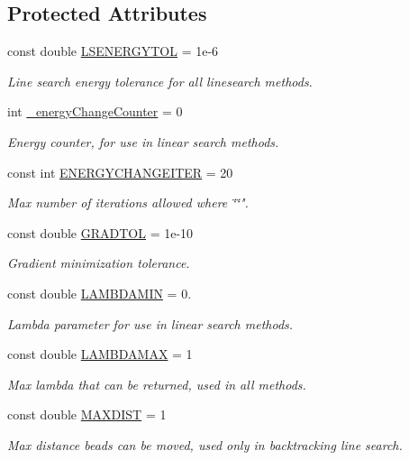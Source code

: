 \subsection*{Protected Attributes}
\begin{DoxyCompactItemize}
\item 
const double \hyperlink{classCGMethod_a084794992bdcec9285f6512b56e6c578}{L\+S\+E\+N\+E\+R\+G\+Y\+T\+O\+L} = 1e-\/6
\begin{DoxyCompactList}\small\item\em Line search energy tolerance for all linesearch methods. \end{DoxyCompactList}\item 
int \hyperlink{classCGMethod_aadb778c988685e46d7d109350973d826}{\+\_\+energy\+Change\+Counter} = 0
\begin{DoxyCompactList}\small\item\em Energy counter, for use in linear search methods. \end{DoxyCompactList}\item 
const int \hyperlink{classCGMethod_aaee1e11813855cc66c360f7cb3d9665a}{E\+N\+E\+R\+G\+Y\+C\+H\+A\+N\+G\+E\+I\+T\+E\+R} = 20
\begin{DoxyCompactList}\small\item\em Max number of iterations allowed where \char`\"{}\char`\"{}". \end{DoxyCompactList}\item 
const double \hyperlink{classCGMethod_ad0118dc4da7526f196a4b4172bba9625}{G\+R\+A\+D\+T\+O\+L} = 1e-\/10
\begin{DoxyCompactList}\small\item\em Gradient minimization tolerance. \end{DoxyCompactList}\end{DoxyCompactItemize}
{\bf }\par
\begin{DoxyCompactItemize}
\item 
const double \hyperlink{classCGMethod_ae28b20ab18f9a0b7c6a1c443add1026e}{L\+A\+M\+B\+D\+A\+M\+I\+N} = 0.
\begin{DoxyCompactList}\small\item\em Lambda parameter for use in linear search methods. \end{DoxyCompactList}\item 
const double \hyperlink{classCGMethod_a04127fd877e82fdf4f71cd3709581419}{L\+A\+M\+B\+D\+A\+M\+A\+X} = 1
\begin{DoxyCompactList}\small\item\em Max lambda that can be returned, used in all methods. \end{DoxyCompactList}\item 
const double \hyperlink{classCGMethod_a814ea57c3493f31f4ffd1cfa71795871}{M\+A\+X\+D\+I\+S\+T} = 1
\begin{DoxyCompactList}\small\item\em Max distance beads can be moved, used only in backtracking line search. \end{DoxyCompactList}\end{DoxyCompactItemize}

